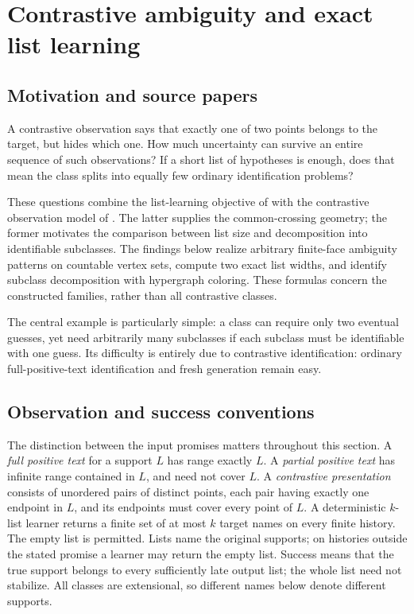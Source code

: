\section{Contrastive ambiguity and exact list learning}
\label{ca:chapter}
\subsection{Motivation and source papers}
A contrastive observation says that exactly one of two points belongs to the target, but hides which one. How much uncertainty can survive an entire sequence of such observations? If a short list of hypotheses is enough, does that mean the class splits into equally few ordinary identification problems?

These questions combine the list-learning objective of \citet{P14} with the contrastive observation model of \citet{P28}. The latter supplies the common-crossing geometry; the former motivates the comparison between list size and decomposition into identifiable subclasses. The findings below realize arbitrary finite-face ambiguity patterns on countable vertex sets, compute two exact list widths, and identify subclass decomposition with hypergraph coloring. These formulas concern the constructed families, rather than all contrastive classes.

The central example is particularly simple: a class can require only two eventual guesses, yet need arbitrarily many subclasses if each subclass must be identifiable with one guess. Its difficulty is entirely due to contrastive identification: ordinary full-positive-text identification and fresh generation remain easy.

\subsection{Observation and success conventions}
The distinction between the input promises matters throughout this section. A \emph{full positive text} for a support $L$ has range exactly $L$. A \emph{partial positive text} has infinite range contained in $L$, and need not cover $L$. A \emph{contrastive presentation} consists of unordered pairs of distinct points, each pair having exactly one endpoint in $L$, and its endpoints must cover every point of $L$. A deterministic $k$-list learner returns a finite set of at most $k$ target names on every finite history. The empty list is permitted. Lists name the original supports; on histories outside the stated promise a learner may return the empty list. Success means that the true support belongs to every sufficiently late output list; the whole list need not stabilize. All classes are extensional, so different names below denote different supports.

